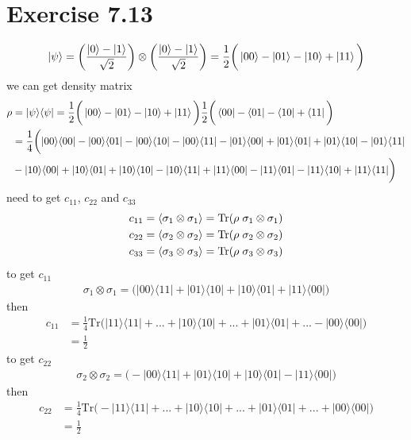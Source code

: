 \documentclass{article}
\newcommand{\op}[2]{|#1\rangle \langle#2|}
\newcommand{\tensor}[2]{#1 \otimes #2}
\begin{document}
 \section*{Exercise 7.13}
\begin{align*}
    \ket{\psi} = \bigg(\frac{\ket{0}-\ket{1}}{\sqrt{2}}\bigg)\otimes\bigg(\frac{\ket{0}-\ket{1}}{\sqrt{2}}\bigg) = \frac{1}{2}\bigg(\ket{00}-\ket{01}-\ket{10}+\ket{11}\bigg)
\end{align*}
we can get density matrix
\begin{align*}
    \rho &= \op{\psi}{\psi} = \frac{1}{2}\bigg(\ket{00}-\ket{01}-\ket{10}+\ket{11}\bigg)\frac{1}{2}\bigg(\bra{00}-\bra{01}-\bra{10}+\bra{11}\bigg) \\
    &= \frac{1}{4}\bigg(\op{00}{00}-\op{00}{01}-\op{00}{10}-\op{00}{11}
    -\op{01}{00}+\op{01}{01}+\op{01}{10}-\op{01}{11} \\
    &-\op{10}{00}+\op{10}{01}+\op{10}{10}-\op{10}{11}+\op{11}{00}-\op{11}{01}-\op{11}{10}+\op{11}{11}\bigg)
\end{align*}
need to get $c_{11}$, $c_{22}$ and $c_{33}$
\begin{align*}
    c_{11} = \braket{\tensor{\sigma_1}{\sigma_1}} = \text{Tr}(\rho\hspace{0.1cm} \tensor{\sigma_1}{\sigma_1})\\
    c_{22} = \braket{\tensor{\sigma_2}{\sigma_2}} = \text{Tr}(\rho\hspace{0.1cm} \tensor{\sigma_2}{\sigma_2})\\
    c_{33} = \braket{\tensor{\sigma_3}{\sigma_3}} = \text{Tr}(\rho\hspace{0.1cm} \tensor{\sigma_3}{\sigma_3})
\end{align*}
to get $c_{11}$
\begin{align*}
    \tensor{\sigma_1}{\sigma_1} = \big(\op{00}{11}+\op{01}{10}+\op{10}{01}+\op{11}{00}\big)
\end{align*}
then
\begin{align*}
    c_{11} &= \frac{1}{4}\text{Tr}\bigg(\op{11}{11}+...+\op{10}{10}+...+\op{01}{01}+...-\op{00}{00}\bigg)\\
    &= \frac{1}{2}
\end{align*}
to get $c_{22}$
\begin{align*}
    \tensor{\sigma_2}{\sigma_2} = \big(-\op{00}{11}+\op{01}{10}+\op{10}{01}-\op{11}{00}\big)
\end{align*}
then
\begin{align*}
    c_{22} &= \frac{1}{4}\text{Tr}\bigg(-\op{11}{11}+...+\op{10}{10}+...+\op{01}{01}+...+\op{00}{00}\bigg)\\
    &= \frac{1}{2}
\end{align*}
\end{document}
